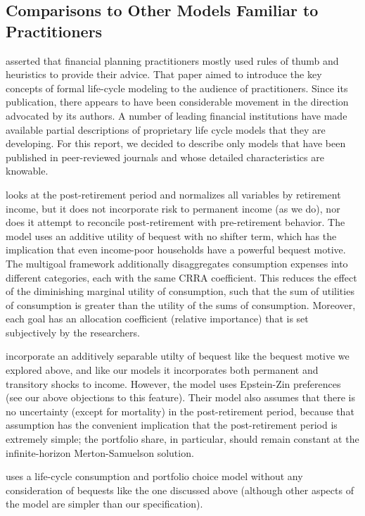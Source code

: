 \documentclass{article}
\begin{document}
\subsection{Comparisons to Other Models Familiar to Practitioners}

\cite{Gordon_2014} asserted that financial planning practitioners mostly used rules of thumb and heuristics to provide their advice.
That paper aimed to introduce the key concepts of formal life-cycle modeling to the audience of practitioners.
Since its publication, there appears to have been considerable movement in the direction advocated by its authors.
A number of leading financial institutions have made available partial descriptions of proprietary life cycle models that they are developing.
For this report, we decided to describe only models that have been published in peer-reviewed journals and whose detailed characteristics are knowable.

\cite{Daga_2023} looks at the post-retirement period and normalizes all variables by retirement income, but it does not incorporate risk to permanent income (as we do), nor does it attempt to reconcile post-retirement with pre-retirement behavior.
The model uses an additive utility of bequest with no shifter term, which has the implication that even income-poor households have a powerful bequest motive.
The multigoal framework additionally disaggregates consumption expenses into different categories, each with the same CRRA coefficient.
This reduces the effect of the diminishing marginal utility of consumption, such that the sum of utilities of consumption is greater than the utility of the sums of consumption.
Moreover, each goal has an allocation coefficient (relative importance) that is set subjectively by the researchers.

\cite{O_Hara_2015} incorporate an additively separable utilty of bequest like the bequest motive we explored above, and like our models it incorporates both permanent and transitory shocks to income.
However, the model uses Epstein-Zin preferences (see our above objections to this feature).
Their model also assumes that there is no uncertainty (except for mortality) in the post-retirement period, because that assumption has the convenient implication that the post-retirement period is extremely simple; the portfolio share, in particular, should remain constant at the infinite-horizon Merton-Samuelson solution.

\cite{Lanski_2022} uses a life-cycle consumption and portfolio choice model without any consideration of bequests like the one discussed above (although other aspects of the model are simpler than our specification).
\end{document}
